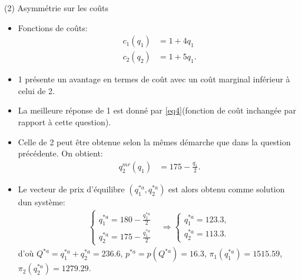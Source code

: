     \begin{frame}[allowframebreaks]{(2) Asymmétrie sur les coûts}
    \begin{itemize}
        \item Fonctions de coûts:
        \begin{align*}
            c_1(q_1) &= 1+4q_1\\
            c_2(q_2) &= 1+5q_1.
        \end{align*}
        \item 1 présente un avantage en termes de coût avec un coût marginal inférieur à celui de 2.
        \item La meilleure réponse de 1 est donné par \eqref{eq4}(fonction de coût inchangée par rapport à cette question). 
        \item Celle de 2 peut être obtenue selon la mêmes démarche que dans la question précédente. On obtient: 
        \begin{align*}
            q_2^{mr}(q_1) &= 175 - \frac{q_1}{2}.
        \end{align*}
        \item Le vecteur de prix d'équilibre $(q_1^{*a}, q_2^{*a})$ est alors obtenu comme solution dun système: 
        \begin{align*}
        \left\{
        \begin{array}{l}
        q_1^{*a} = 180 - \frac{q_2^{*a}}{2}\\
        q_2^{*a} = 175 - \frac{q_1^{*a}}{2}
        \end{array}
        \right.
        &\Rightarrow 
        \left\{
        \begin{array}{l}
        q_1^{*a} =123.3,\\
         q_2^{*a} = 113.3.
        \end{array} \right.
        \end{align*}
       d'où 
       $Q^{*a} = q_1^{*a} + q_2^{*a} = 236.6$, $p^{*a} = p(Q^{*a}) = 16.3$, $\pi_1(q_1^{*a}) = 1515.59$, $\pi_2(q_2^{*a}) = 1279.29$.
 
    \end{itemize}
\end{frame}   

